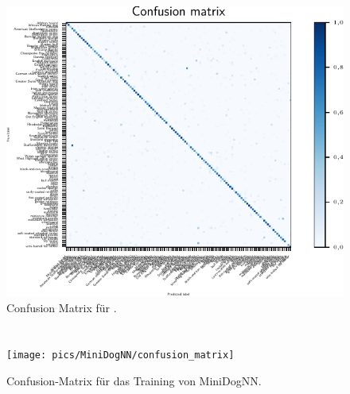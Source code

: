 \begin{figure}
  \centering
  \includegraphics[scale=0.8]{pics/ergebnisse/PreBigDogNN/confusion_matrix.pdf}
  \caption{Confusion Matrix für \PreBig.}
  \label{fig:confusion-prebig}
\end{figure}

\section{\MiniDog}

\begin{figure}
  \centering
  \texttt{[image: pics/MiniDogNN/confusion\_matrix]}
  \caption{Confusion-Matrix für das Training von MiniDogNN.}
  \label{fig:confusion-mini}
\end{figure}
